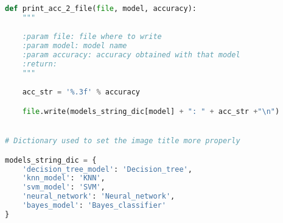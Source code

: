 \documentclass[11pt,a4paper]{article}
\begin{document}
\begin{lstlisting}[language=Python,basicstyle=\tiny]
def print_acc_2_file(file, model, accuracy):
    """

    :param file: file where to write
    :param model: model name
    :param accuracy: accuracy obtained with that model
    :return:
    """

    acc_str = '%.3f' % accuracy

    file.write(models_string_dic[model] + ": " + acc_str +"\n")


# Dictionary used to set the image title more properly

models_string_dic = {
    'decision_tree_model': 'Decision_tree',
    'knn_model': 'KNN',
    'svm_model': 'SVM',
    'neural_network': 'Neural_network',
    'bayes_model': 'Bayes_classifier'
}
\end{lstlisting}
\end{document}
